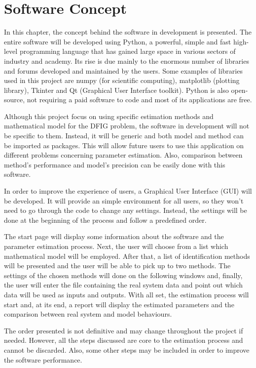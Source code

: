 \chapter{Software Concept}

\label{ch: software}

In this chapter, the concept behind the software in development is presented. The entire software will be developed using Python, a powerful, simple and fast high-level programming language that has gained large space in various sectors of industry and academy. Its rise is due mainly to the enormous number of libraries and forums developed and maintained by the users. Some examples of libraries used in this project are numpy (for scientific computing), matplotlib (plotting library), Tkinter and Qt (Graphical User Interface toolkit). Python is also open-source, not requiring a paid software to code and most of its applications are free.

Although this project focus on using specific estimation methods and mathematical model for the DFIG problem, the software in development will not be specific to them. Instead, it will be generic and both model and method can be imported as packages. This will allow future users to use this application on different problems concerning parameter estimation. Also, comparison between method's performance and model's precision can be easily done with this software.

In order to improve the experience of users, a Graphical User Interface (GUI) will be developed. It will provide an simple environment for all users, so they won't need to go through the code to change any settings. Instead, the settings will be done at the beginning of the process and follow a predefined order.

The start page will display some information about the software and the parameter estimation process. Next, the user will choose from a list which mathematical model will be employed. After that, a list of identification methods will be presented and the user will be able to pick up to two methods. The settings of the chosen methods will done on the following windows and, finally, the user will enter the file containing the real system data and point out which data will be used as inputs and outputs. With all set, the estimation process will start and, at its end, a report will display the estimated parameters and the comparison between real system and model behaviours. 

The order presented is not definitive and may change throughout the project if needed. However, all the steps discussed are core to the estimation process and cannot be discarded. Also, some other steps may be included in order to improve the software performance.